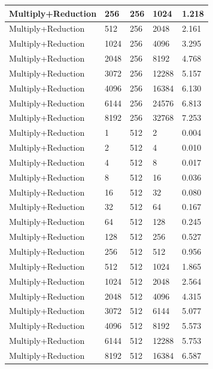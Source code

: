 \documentclass{article}
\begin{document}
\begin{longtable}{|l|l|l|l|l|}
Multiply+Reduction & 256  & 256         & 1024              & 1.218             \\ \hline
Multiply+Reduction & 512  & 256         & 2048              & 2.161             \\ \hline
Multiply+Reduction & 1024 & 256         & 4096              & 3.295             \\ \hline
Multiply+Reduction & 2048 & 256         & 8192              & 4.768             \\ \hline
Multiply+Reduction & 3072 & 256         & 12288             & 5.157             \\ \hline
Multiply+Reduction & 4096 & 256         & 16384             & 6.130             \\ \hline
Multiply+Reduction & 6144 & 256         & 24576             & 6.813             \\ \hline
Multiply+Reduction & 8192 & 256         & 32768             & 7.253             \\ \hline
Multiply+Reduction & 1    & 512         & 2                 & 0.004             \\ \hline
Multiply+Reduction & 2    & 512         & 4                 & 0.010             \\ \hline
Multiply+Reduction & 4    & 512         & 8                 & 0.017             \\ \hline
Multiply+Reduction & 8    & 512         & 16                & 0.036             \\ \hline
Multiply+Reduction & 16   & 512         & 32                & 0.080             \\ \hline
Multiply+Reduction & 32   & 512         & 64                & 0.167             \\ \hline
Multiply+Reduction & 64   & 512         & 128               & 0.245             \\ \hline
Multiply+Reduction & 128  & 512         & 256               & 0.527             \\ \hline
Multiply+Reduction & 256  & 512         & 512               & 0.956             \\ \hline
Multiply+Reduction & 512  & 512         & 1024              & 1.865             \\ \hline
Multiply+Reduction & 1024 & 512         & 2048              & 2.564             \\ \hline
Multiply+Reduction & 2048 & 512         & 4096              & 4.315             \\ \hline
Multiply+Reduction & 3072 & 512         & 6144              & 5.077             \\ \hline
Multiply+Reduction & 4096 & 512         & 8192              & 5.573             \\ \hline
Multiply+Reduction & 6144 & 512         & 12288             & 5.753             \\ \hline
Multiply+Reduction & 8192 & 512         & 16384             & 6.587             \\ \hline   
\end{longtable}
\end{document}
